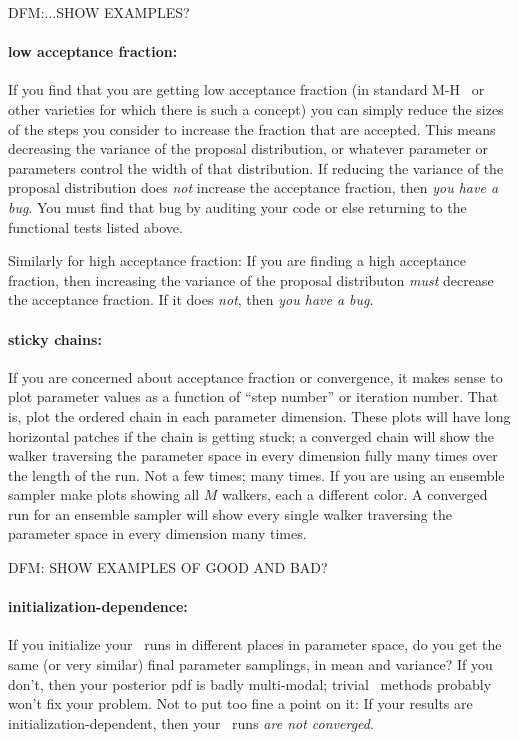 \documentclass[12pt,twoside,pdftex]{article}
\newcommand{\MCMC}{\acronym{MCMC}}
\begin{document}
DFM:...SHOW EXAMPLES?

\paragraph{low acceptance fraction:}
If you find that you are getting low acceptance fraction
  (in standard M-H \MCMC\ or other varieties for which there is such a concept)
  you can simply reduce the sizes of the steps you consider to increase the fraction that are accepted.
This means decreasing the variance of the proposal distribution,
  or whatever parameter or parameters control the width of that distribution.
If reducing the variance of the proposal distribution does \emph{not} increase the acceptance fraction,
  then \emph{you have a bug}.
You must find that bug by auditing your code or else returning to the functional tests listed above.

Similarly for high acceptance fraction:
If you are finding a high acceptance fraction,
  then increasing the variance of the proposal distributon \emph{must} decrease the acceptance fraction.
If it does \emph{not}, then \emph{you have a bug}.

\paragraph{sticky chains:}
If you are concerned about acceptance fraction or convergence,
  it makes sense to plot parameter values as a function of ``step number'' or iteration number.
That is, plot the ordered chain in each parameter dimension.
These plots will have long horizontal patches if the chain is getting stuck;
  a converged chain will show the walker traversing the parameter space in every dimension fully many times
  over the length of the run.
Not a few times; many times.
If you are using an ensemble sampler
  make plots showing all $M$ walkers, each a different color.
A converged run for an ensemble sampler will show every single walker traversing the parameter space
  in every dimension many times.

DFM: SHOW EXAMPLES OF GOOD AND BAD?

\paragraph{initialization-dependence:}
If you initialize your \MCMC\ runs in different places in parameter space,
  do you get the same (or very similar) final parameter samplings,
  in mean and variance?
If you don't,
  then your posterior pdf is badly multi-modal;
  trivial \MCMC\ methods probably won't fix your problem.
Not to put too fine a point on it:
If your results are initialization-dependent,
  then your \MCMC\ runs \emph{are not converged}.
\end{document}
